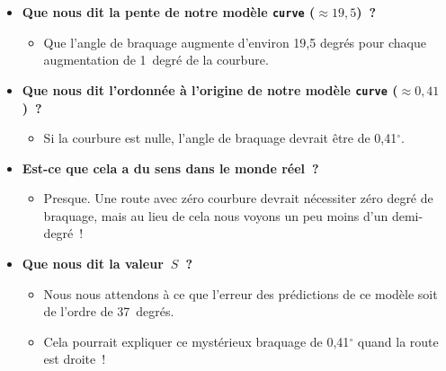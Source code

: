 \documentclass[12pt,a4paper]{article}
\begin{document}
\begin{thinkbox}
  \begin{itemize}
    \item \textbf{Que nous dit la pente de notre modèle \texttt{curve} ($\approx 19{,}5$)~?}
    \begin{itemize}
      \item Que l'angle de braquage augmente d'environ 19,5 degrés pour chaque augmentation de 1~degré de la courbure.
    \end{itemize}
    \item \textbf{Que nous dit l'ordonnée à l'origine de notre modèle \texttt{curve} ($\approx 0{,}41$)~?}
    \begin{itemize}
      \item Si la courbure est nulle, l'angle de braquage devrait être de 0,41$^\circ$.
    \end{itemize}
    \item \textbf{Est-ce que cela a du sens dans le monde réel~?}
    \begin{itemize}
      \item Presque. Une route avec zéro courbure devrait nécessiter zéro degré de braquage, mais au lieu de cela nous voyons un peu moins d'un demi-degré~!
    \end{itemize}
    \item \textbf{Que nous dit la valeur~$S$~?}
    \begin{itemize}
      \item Nous nous attendons à ce que l'erreur des prédictions de ce modèle soit de l'ordre de 37~degrés.
      \item Cela pourrait expliquer ce mystérieux braquage de 0,41$^\circ$ quand la route est droite~!
    \end{itemize}
  \end{itemize}
\end{thinkbox}
\end{document}
